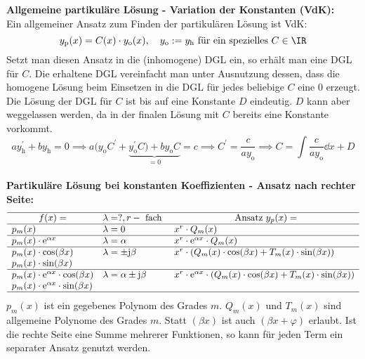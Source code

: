\textbf{Allgemeine partikuläre Lösung - Variation der Konstanten (VdK):}\\
Ein allgemeiner Ansatz zum Finden der partikulären Lösung ist VdK:
\begin{equation}
	y_\text{p}(x)=C(x)\cdot y_\text{o}(x), \quad y_\text{o}:=y_\text{h} \text{ für ein spezielles } C\in\IR
\end{equation}
Setzt man diesen Ansatz in die (inhomogene) DGL ein, so erhält man eine DGL für $C$. Die erhaltene DGL vereinfacht man unter Ausnutzung dessen, dass die homogene Lösung beim Einsetzen in die DGL für jedes beliebige $C$ eine 0 erzeugt. Die Lösung der DGL für $C$ ist bis auf eine Konstante $D$ eindeutig. $D$ kann aber weggelassen werden, da in der finalen Lösung mit $C$ bereits eine Konstante vorkommt.
\begin{equation}
		ay_\text{h}^\prime+by_\text{h}=0 \implies a(y_\text{o} C^\prime+\underbrace{y_\text{o}^\prime C )+by_\text{o}C}_{=0}=c \implies C^\prime = \frac{c}{a y_\text{o}} \implies C=\int \frac{c}{a y_\text{o}} \dd x +D
\end{equation}\\
\textbf{Partikuläre Lösung bei konstanten Koeffizienten - Ansatz nach rechter Seite:}\\
\begin{equation}
	\begin{array}{lll}
		\hline \multicolumn{1}{c}{f(x)=} & \lambda=?, r-\text { fach } & \multicolumn{1}{c}{\text { Ansatz } y_p(x)=} \\
		\hline p_m(x) & \lambda=0 & x^r \cdot Q_m(x) \\
		\hline p_m(x) \cdot \mathrm{e}^{\alpha x} & \lambda=\alpha &  {x}^r \cdot \mathrm{e}^{\alpha x} \cdot Q_m(x) \\
		\hline p_m(x) \cdot \cos (\beta x) & \lambda= \pm  \mathrm{j}\beta &  {x}^r \cdot\left(Q_m(x) \cdot \cos (\beta  {x})+T_m(x) \cdot \sin (\beta  {x})\right) \\
		p_m(x) \cdot \sin (\beta  {x}) & & \\
		\hline p_m(x) \cdot \mathrm{e}^{\alpha x} \cdot \cos (\beta x) &\lambda=\alpha\pm \mathrm{j}\beta  &  {x}^r \cdot \mathrm{e}^{\alpha x} \cdot\left(Q_m(x) \cdot \cos (\beta  {x})+T_m(x) \cdot \sin (\beta  {x})\right) \\
		 p_m(x) \cdot \mathrm{e}^{\alpha x} \cdot \sin (\beta  {x}) & \\
		\hline
	\end{array}
\end{equation}
$p_m(x)$ ist ein gegebenes Polynom des Grades $m$. $Q_m(x) \text{ und } T_m(x)$ sind allgemeine Polynome des Grades $m$. Statt $(\beta x)$ ist auch $(\beta x+\varphi)$ erlaubt. Ist die rechte Seite eine Summe mehrerer Funktionen, so kann für jeden Term ein separater Ansatz genutzt werden.
